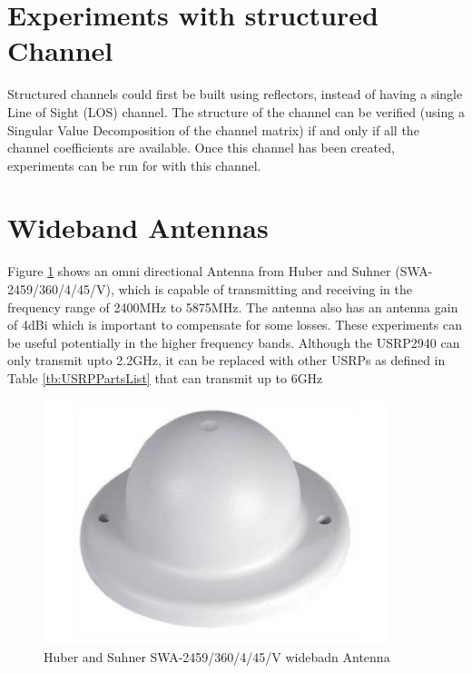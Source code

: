 \section{Experiments with structured Channel}\label{sec:StrucChannel}
Structured channels could first be built using reflectors, instead of having a single Line of Sight (LOS) channel. The structure of the channel can be verified (using a Singular Value Decomposition of the channel matrix) if and only if all the channel coefficients are available. Once this channel has been created, experiments can be run for with this channel.

\section{Wideband Antennas}\label{sec:WdBdAntennas}

Figure \ref{fig:HandSAnt} shows an omni directional Antenna from Huber and Suhner (SWA-
2459/360/4/45/V), which is capable of transmitting and receiving in the frequency range of 2400MHz to 5875MHz. The antenna also has an antenna gain of 4dBi which is important to compensate for some losses. These experiments can be useful potentially in the higher frequency bands. Although the USRP2940 can only transmit upto 2.2\si{\giga\hertz}, it can be replaced with other USRPs as defined in Table \ref{tb:USRPPartsList} that can transmit up to 6\si{\giga\hertz}

\begin{figure}[!htb]
    \centering
    \includegraphics[width=10cm]{images/HuberAntenna.png}
    \caption{Huber and Suhner SWA-2459/360/4/45/V widebadn Antenna}
    \label{fig:HandSAnt}
\end{figure}

